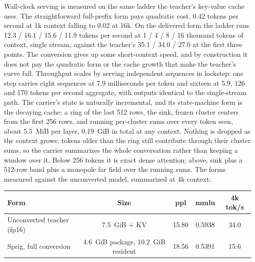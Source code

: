 \documentclass[11pt]{article}
\begin{document}
Wall-clock serving is measured on the same ladder the teacher's
key-value cache uses. The straightforward full-prefix form pays
quadratic cost, 0.42 tokens per second at 1k context falling to
0.02 at 16k. On the delivered form the ladder runs 12.3 / 16.1 / 15.6 / 11.9
tokens per second at 1 / 4 / 8 / 16
thousand tokens of context, single stream, against the teacher's
35.1 / 34.0 / 27.0 at the first three points. The conversion
gives up some short-context speed, and by construction it does
not pay the
quadratic form or the cache growth that make the teacher's curve
fall. Throughput scales by serving independent sequences in
lockstep: one step carries eight sequences at 7.9 milliseconds
per token and sixteen at 5.9, 126 and 170 tokens per second
aggregate, with outputs identical to the single-stream path. The
carrier's
state is naturally incremental, and its state-machine form is the
decaying cache: a ring of the last 512 rows, the sink, frozen
cluster centers from the first 256 rows, and running per-cluster
sums over every token seen, about 5.5~MiB per layer, 0.19~GiB in
total at any context. Nothing is dropped as the context grows:
tokens older than the ring still contribute through their
cluster sums, so
the carrier summarizes the whole conversation rather than
keeping a window over it. Below 256 tokens it
is exact dense attention; above, sink plus a 512-row band plus a
monopole far field over the running sums. The
forms measured against the unconverted model, summarized at 4k
context:

\begin{center}
\begin{tabular}{lcccc}
\toprule
Form & Size & ppl & mmlu & 4k tok/s \\
\midrule
Unconverted teacher (fp16) & 7.5~GiB $+$ KV & 15.80 & 0.5938 & 34.0 \\
Sprig, full conversion & 4.6~GiB package, 10.2~GiB resident & 18.56 & 0.5391 & 15.6 \\
\bottomrule
\end{tabular}
\end{center}
\end{document}
